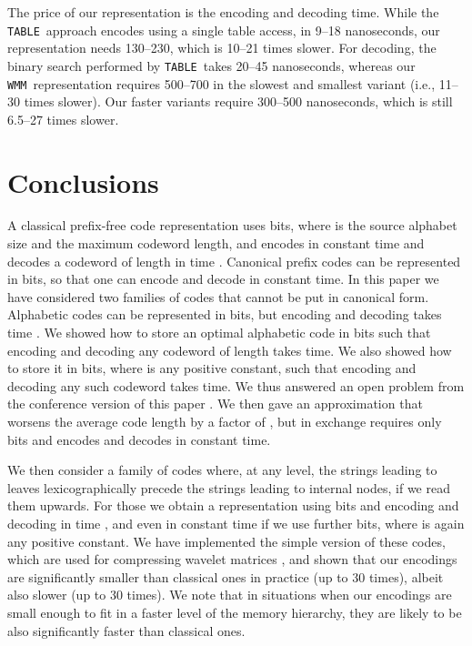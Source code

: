 \documentclass[preprint,12pt]{elsarticle}
\newcommand{\wmm}{\texttt{WMM}}
\newcommand{\tablen}{\texttt{TABLE}}
\begin{document}
The price of our representation is the encoding and decoding time. While the
\tablen\ approach encodes using a single table access, in 9--18 nanoseconds,
our representation needs 130--230, which is 10--21 times slower. For
decoding, the binary search performed by \tablen\ takes 20--45 nanoseconds,
whereas our \wmm\ representation requires 500--700 in the slowest and smallest
variant (i.e., 11--30 times slower). Our faster variants require 300--500
nanoseconds, which is still 6.5--27 times slower.

\section{Conclusions}

A classical prefix-free code representation uses  bits, where
 is the source alphabet size and  the maximum codeword length, and
encodes in constant time and decodes a codeword of length  in time
.
Canonical prefix codes can be represented in  bits, so that
one can encode and decode in constant time. In this paper we have considered
two families of codes that cannot be put in canonical form. Alphabetic codes
can be represented in  bits, but encoding and decoding
takes time . We showed how to store an optimal alphabetic code in  bits such that encoding and decoding any codeword of length  takes  time. We also showed how to store it in  bits, 
where  is any positive constant, such that encoding and decoding any such codeword takes  time.  We thus answered an open problem from the conference version of this paper \cite{SPIRE16}.  We then gave an approximation that worsens the average code
length by a factor of , but in exchange
requires only  bits and encodes and decodes in constant time. 

We then consider a family of codes where, at any level, the strings leading to 
leaves lexicographically precede the strings leading to internal nodes, if we 
read them upwards.
For those we obtain a representation using  bits and encoding
and decoding in time , and even in constant time 
if we use  further bits, where  is again any positive constant.  We have implemented the simple version of these codes, which
are used for compressing wavelet matrices \cite{CNO15}, and shown that our encodings are
significantly smaller than classical ones in practice (up to 30 times),
albeit also slower (up to 30 times).
We note that in situations when our encodings are small enough to fit in a faster level of the memory hierarchy, they are likely to be also significantly faster than classical ones.
\end{document}
